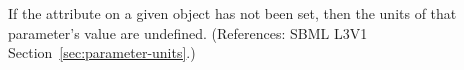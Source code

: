 If the  attribute on a given \Parameter object has not been
set, then the units of that parameter's value are undefined.  (References:
SBML L3V1 Section~\ref{sec:parameter-units}.)
